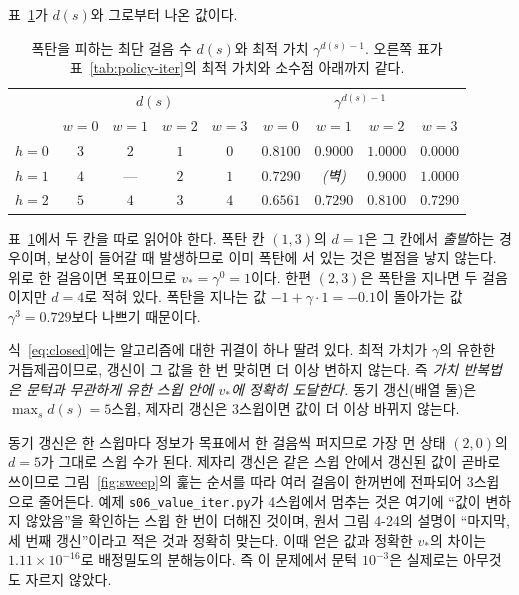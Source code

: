 \documentclass[11pt,a4paper]{article}
\begin{document}
표~\ref{tab:closed}가 $d(s)$와 그로부터 나온 값이다.

\begin{table}[htbp]
\centering
\caption{폭탄을 피하는 최단 걸음 수 $d(s)$와 최적 가치 $\gamma^{d(s)-1}$. 오른쪽 표가
표~\ref{tab:policy-iter}의 최적 가치와 소수점 아래까지 같다.}
\label{tab:closed}
\small
\begin{tabular}{@{}lcccc|cccc@{}}
\toprule
 & \multicolumn{4}{c|}{$d(s)$} & \multicolumn{4}{c}{$\gamma^{d(s)-1}$} \\
 & $w=0$ & $w=1$ & $w=2$ & $w=3$ & $w=0$ & $w=1$ & $w=2$ & $w=3$ \\
\midrule
$h=0$ & $3$ & $2$ & $1$ & $0$ & $0.8100$ & $0.9000$ & $1.0000$ & $0.0000$ \\
$h=1$ & $4$ & --- & $2$ & $1$ & $0.7290$ & \textit{(벽)} & $0.9000$ & $1.0000$ \\
$h=2$ & $5$ & $4$ & $3$ & $4$ & $0.6561$ & $0.7290$ & $0.8100$ & $0.7290$ \\
\bottomrule
\end{tabular}
\end{table}

표~\ref{tab:closed}에서 두 칸을 따로 읽어야 한다. 폭탄 칸 $(1,3)$의 $d=1$은 그 칸에서 \emph{출발}하는
경우이며, 보상이 들어갈 때 발생하므로 이미 폭탄에 서 있는 것은 벌점을 낳지 않는다. 위로 한 걸음이면
목표이므로 $v_*=\gamma^0=1$이다. 한편 $(2,3)$은 폭탄을 지나면 두 걸음이지만 $d=4$로 적혀 있다.
폭탄을 지나는 값 $-1+\gamma\cdot1=-0.1$이 돌아가는 값 $\gamma^3=0.729$보다 나쁘기 때문이다.

식~\eqref{eq:closed}에는 알고리즘에 대한 귀결이 하나 딸려 있다. 최적 가치가 $\gamma$의 유한한
거듭제곱이므로, 갱신이 그 값을 한 번 맞히면 더 이상 변하지 않는다. 즉 \emph{가치 반복법은 문턱과
무관하게 유한 스윕 안에 $v_*$에 정확히 도달한다.} 동기 갱신(배열 둘)은 $\max_s d(s)=5$스윕, 제자리
갱신은 $3$스윕이면 값이 더 이상 바뀌지 않는다.

동기 갱신은 한 스윕마다 정보가 목표에서 한 걸음씩 퍼지므로 가장 먼
상태 $(2,0)$의 $d=5$가 그대로 스윕 수가 된다. 제자리 갱신은 같은 스윕 안에서 갱신된 값이 곧바로
쓰이므로 그림~\ref{fig:sweep}의 훑는 순서를 따라 여러 걸음이 한꺼번에 전파되어 3스윕으로 줄어든다.
예제 \texttt{s06\_value\_iter.py}가 4스윕에서 멈추는 것은 여기에 ``값이 변하지 않았음''을 확인하는
스윕 한 번이 더해진 것이며, 원서 그림 4-24의 설명이 ``마지막, 세 번째 갱신''이라고 적은 것과
정확히 맞는다. 이때 얻은 값과 정확한 $v_*$의 차이는 $1.11\times10^{-16}$로 배정밀도의 분해능이다.
즉 이 문제에서 문턱 $10^{-3}$은 실제로는 아무것도 자르지 않았다.
\end{document}
